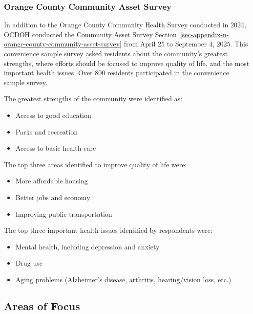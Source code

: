 \documentclass[
  english,
  letterpaper,
]{report}
\providecommand{\tightlist}{%
  \setlength{\itemsep}{0pt}\setlength{\parskip}{0pt}}
\begin{document}
\subsubsection{Orange County Community Asset
Survey}\label{orange-county-community-asset-survey}

In addition to the Orange County Community Health Survey conducted in
2024, OCDOH conducted the Community Asset Survey
Section~\ref{sec-appendix-n-orange-county-community-asset-survey} from
April 25 to September 4, 2025. This convenience sample survey asked
residents about the community's greatest strengths, where efforts should
be focused to improve quality of life, and the most important health
issues. Over 800 residents participated in the convenience sample
survey.

The greatest strengths of the community were identified as:

\begin{itemize}
\tightlist
\item
  Access to good education
\item
  Parks and recreation
\item
  Access to basic health care
\end{itemize}

The top three areas identified to improve quality of life were:

\begin{itemize}
\tightlist
\item
  More affordable housing
\item
  Better jobs and economy
\item
  Improving public transportation
\end{itemize}

The top three important health issues identified by respondents were:

\begin{itemize}
\tightlist
\item
  Mental health, including depression and anxiety
\item
  Drug use
\item
  Aging problems (Alzheimer's disease, arthritis, hearing/vision loss,
  etc.)
\end{itemize}

\subsection{Areas of Focus}\label{areas-of-focus-1}
\end{document}
